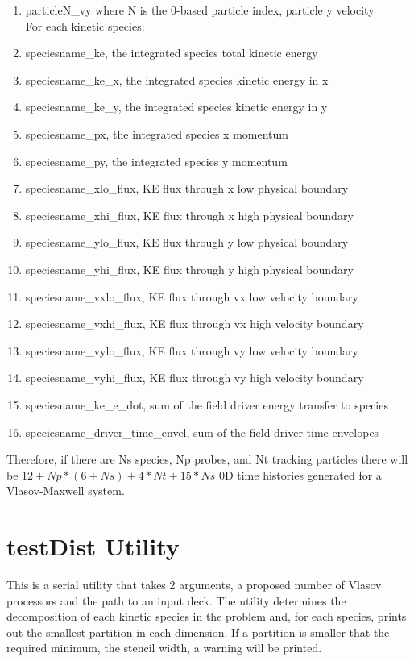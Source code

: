 \documentclass[11pt]{amsart}
\begin{document}
\begin{enumerate}
\item particleN\_vy where N is the 0-based particle index, particle y velocity \\
For each kinetic species:
\item speciesname\_ke, the integrated species total kinetic energy
\item speciesname\_ke\_x, the integrated species kinetic energy in x
\item speciesname\_ke\_y, the integrated species kinetic energy in y
\item speciesname\_px, the integrated species x momentum
\item speciesname\_py, the integrated species y momentum
\item speciesname\_xlo\_flux, KE flux through x low physical boundary
\item speciesname\_xhi\_flux, KE flux through x high physical boundary
\item speciesname\_ylo\_flux, KE flux through y low physical boundary
\item speciesname\_yhi\_flux, KE flux through y high physical boundary
\item speciesname\_vxlo\_flux, KE flux through vx low velocity boundary
\item speciesname\_vxhi\_flux, KE flux through vx high velocity boundary
\item speciesname\_vylo\_flux, KE flux through vy low velocity boundary
\item speciesname\_vyhi\_flux, KE flux through vy high velocity boundary
\item speciesname\_ke\_e\_dot, sum of the field driver energy transfer to species
\item speciesname\_driver\_time\_envel, sum of the field driver time envelopes
\end{enumerate}
Therefore, if there are Ns species, Np probes, and Nt tracking particles there
will be $12+Np*(6+Ns)+4*Nt+15*Ns$ 0D time histories generated for a
Vlasov-Maxwell system.

\section*{testDist Utility}
This is a serial utility that takes 2 arguments, a proposed number of Vlasov
processors and the path to an input deck.  The utility determines the
decomposition of each kinetic species in the problem and, for each species,
prints out the smallest partition in each dimension.  If a partition is smaller
that the required minimum, the stencil width, a warning will be printed.
\end{document}

